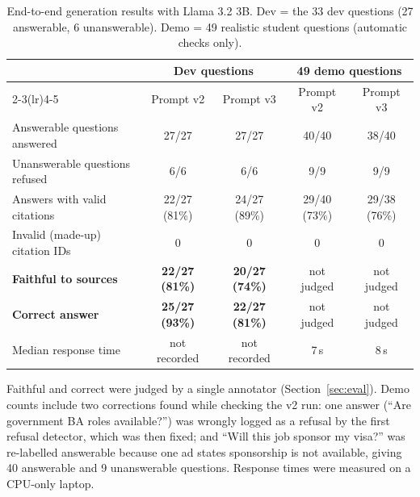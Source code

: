 \begin{table}[H]
\caption{End-to-end generation results with Llama 3.2 3B. Dev = the 33 dev questions (27 answerable, 6 unanswerable). Demo = 49 realistic student questions (automatic checks only).}\label{tab:gen}
\small
\begin{tabular}{lcccc}
\toprule
 & \multicolumn{2}{c}{Dev questions} & \multicolumn{2}{c}{49 demo questions} \\
\cmidrule(lr){2-3}\cmidrule(lr){4-5}
 & Prompt v2 & Prompt v3 & Prompt v2 & Prompt v3 \\
\midrule
Answerable questions answered & 27/27 & 27/27 & 40/40 & 38/40 \\
Unanswerable questions refused & 6/6 & 6/6 & 9/9 & 9/9 \\
Answers with valid citations & 22/27 (81\%) & 24/27 (89\%) & 29/40 (73\%) & 29/38 (76\%) \\
Invalid (made-up) citation IDs & 0 & 0 & 0 & 0 \\
\textbf{Faithful to sources} & \textbf{22/27 (81\%)} & \textbf{20/27 (74\%)} & not judged & not judged \\
\textbf{Correct answer} & \textbf{25/27 (93\%)} & \textbf{22/27 (81\%)} & not judged & not judged \\
Median response time & not recorded & not recorded & 7\,s & 8\,s \\
\bottomrule
\end{tabular}

\smallskip
\begin{minipage}{0.95\linewidth}\footnotesize
Faithful and correct were judged by a single annotator (Section~\ref{sec:eval}). Demo counts include two corrections found while checking the v2 run: one answer (``Are government BA roles available?'') was wrongly logged as a refusal by the first refusal detector, which was then fixed; and ``Will this job sponsor my visa?'' was re-labelled answerable because one ad states sponsorship is not available, giving 40 answerable and 9 unanswerable questions. Response times were measured on a CPU-only laptop.
\end{minipage}
\end{table}


